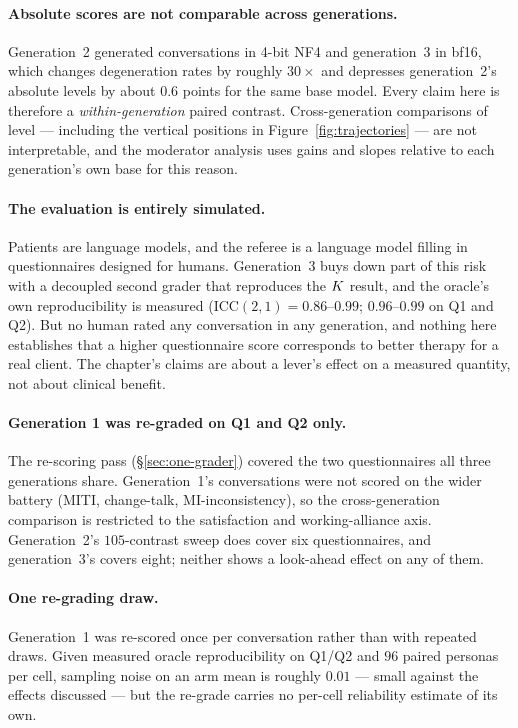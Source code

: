 \paragraph{Absolute scores are not comparable across generations.}
Generation~2 generated conversations in 4-bit NF4 and generation~3 in bf16, which changes
degeneration rates by roughly $30\times$ and depresses generation~2's absolute levels by about
$0.6$ points for the same base model. Every claim here is therefore a \emph{within-generation}
paired contrast. Cross-generation comparisons of level --- including the vertical positions in
Figure~\ref{fig:trajectories} --- are not interpretable, and the moderator analysis uses gains
and slopes relative to each generation's own base for this reason.

\paragraph{The evaluation is entirely simulated.}
Patients are language models, and the referee is a language model filling in questionnaires
designed for humans. Generation~3 buys down part of this risk with a decoupled second grader
that reproduces the $K$ result, and the oracle's own reproducibility is measured
($\mathrm{ICC}(2,1) = 0.86$--$0.99$; $0.96$--$0.99$ on Q1 and Q2). But no human rated any
conversation in any generation, and nothing here establishes that a higher questionnaire score
corresponds to better therapy for a real client. The chapter's claims are about a lever's effect
on a measured quantity, not about clinical benefit.

\paragraph{Generation 1 was re-graded on Q1 and Q2 only.}
The re-scoring pass (\S\ref{sec:one-grader}) covered the two questionnaires all three generations
share. Generation~1's conversations were not scored on the wider battery (MITI, change-talk,
MI-inconsistency), so the cross-generation comparison is restricted to the satisfaction and
working-alliance axis. Generation~2's $105$-contrast sweep does cover six questionnaires, and
generation~3's covers eight; neither shows a look-ahead effect on any of them.

\paragraph{One re-grading draw.}
Generation~1 was re-scored once per conversation rather than with repeated draws. Given measured
oracle reproducibility on Q1/Q2 and $96$ paired personas per cell, sampling noise on an arm mean
is roughly $0.01$ --- small against the effects discussed --- but the re-grade carries no
per-cell reliability estimate of its own.

